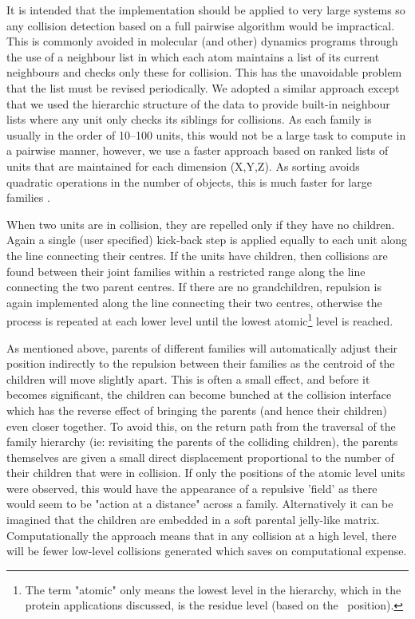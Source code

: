 It is intended that the implementation should be applied to very large
systems so any collision detection based on a full pairwise algorithm
would be impractical.  This is commonly avoided in molecular (and other)
dynamics programs through the use of a neighbour list in which each atom
maintains a list of its current neighbours and checks only these for
collision.  This has the unavoidable problem that the list must be
revised periodically.   We adopted a similar approach except that we
used the hierarchic structure of the data to provide built-in neighbour
lists where any unit only checks its siblings for collisions.  As each
family is usually in the order of 10--100 units, this would not be a
large task to compute in a pairwise manner, however, we use a faster
approach based on ranked lists of units that are maintained for each
dimension (X,Y,Z).   As sorting avoids quadratic operations in the
number of objects, this is much faster for large families \cite{TaylorWRet10a}.

When two units are in collision, they are repelled only if they have no
children.  Again a single (user specified) kick-back step is applied
equally to each unit along the line connecting their centres.
If the units have children, then collisions are found between their
joint families within a restricted range along the line connecting the
two parent centres.  If there are no grandchildren, repulsion is again
implemented along the line connecting their two centres, otherwise the
process is repeated at each lower level until the lowest atomic\footnote{
The term "atomic" only means the lowest level in the 
hierarchy, which in the protein applications discussed, is the
residue level (based on the \CA\ position).}
level is reached.

As mentioned above, parents of different families will automatically
adjust their position indirectly to the repulsion between their families
as the centroid of the children will move slightly apart.   This is 
often a small effect, and before it becomes significant, the children 
can become bunched at the collision interface which has the reverse
effect of bringing the parents (and hence their children) even closer
together.   To avoid this, on the return path from the traversal of the
family hierarchy (ie: revisiting the parents of the colliding children),
the parents themselves are given a small direct displacement proportional
to the number of their children that were in collision.   If only the 
positions of the atomic level units were observed, this would have the
appearance of a repulsive 'field'  as there would seem to be "action
at a distance" across a family.  Alternatively it can be imagined that
the children are embedded in a soft parental jelly-like matrix.
Computationally the approach means that in any collision at a high
level, there will be fewer low-level collisions generated which saves
on computational expense.

